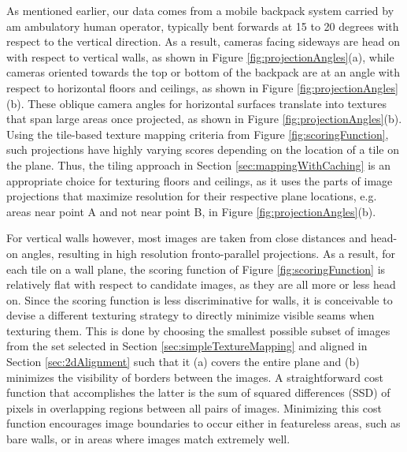 \documentclass[]{spie}  %
\begin{document}
As mentioned earlier, our data comes from a mobile backpack system
carried by am ambulatory human operator, typically bent forwards at 15
to 20 degrees with respect to the vertical direction. As a result,
cameras facing sideways are head on with respect to vertical walls, as
shown in Figure \ref{fig:projectionAngles}(a), while cameras oriented
towards the top or bottom of the backpack are at an angle with respect
to horizontal floors and ceilings, as shown in Figure
\ref{fig:projectionAngles}(b). These oblique camera angles for
horizontal surfaces translate into textures that span large areas once
projected, as shown in Figure \ref{fig:projectionAngles}(b). Using the
tile-based texture mapping criteria from Figure
\ref{fig:scoringFunction}, such projections have highly varying scores
depending on the location of a tile on the plane. Thus, the tiling
approach in Section \ref{sec:mappingWithCaching} is an appropriate
choice for texturing floors and ceilings, as it uses the parts of
image projections that maximize resolution for their respective plane
locations, e.g. areas near point A and not near point B, in Figure
\ref{fig:projectionAngles}(b).


For vertical walls however, most images are taken from close distances
and head-on angles, resulting in high resolution fronto-parallel
projections. As a result, for each tile on a wall plane, the scoring
function of Figure \ref{fig:scoringFunction} is relatively flat with
respect to candidate images, as they are all more or less head
on. Since the scoring function is less discriminative for walls, it is
conceivable to devise a different texturing strategy to directly
minimize visible seams when texturing them. This is done by choosing
the smallest possible subset of images from the set selected in
Section \ref{sec:simpleTextureMapping} and aligned in Section
\ref{sec:2dAlignment} such that it (a) covers the entire plane and (b)
minimizes the visibility of borders between the images. A
straightforward cost function that accomplishes the latter is the sum
of squared differences (SSD) of pixels in overlapping regions between
all pairs of images. Minimizing this cost function encourages image
boundaries to occur either in featureless areas, such as bare walls,
or in areas where images match extremely well.
\end{document}
